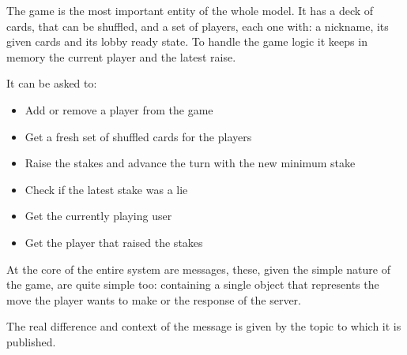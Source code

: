 \documentclass{scrartcl}
\begin{document}
The game is the most important entity of the whole model. It has a deck of cards, that can be shuffled,
and a set of players, each one with: a nickname, its given cards and its lobby ready state.
To handle the game logic it keeps in memory the current player and the latest raise.

It can be asked to:
\begin{itemize}
      \item Add or remove a player from the game
      \item Get a fresh set of shuffled cards for the players
      \item Raise the stakes and advance the turn with the new minimum stake
      \item Check if the latest stake was a lie
      \item Get the currently playing user
      \item Get the player that raised the stakes
\end{itemize}

At the core of the entire system are messages, these, given the simple nature of the game,
are quite simple too: containing a single object that represents the move the player wants to make or
the response of the server.

The real difference and context of the message is given by the topic to which it is published.
\end{document}
